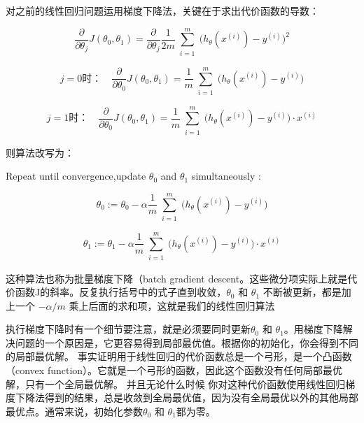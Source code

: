 \documentclass[UTF8]{ctexart}
\begin{document}
对之前的线性回归问题运用梯度下降法，关键在于求出代价函数的导数：

\begin{equation*}
    \frac{\partial}{\partial\theta_j}
    J(\theta_0,\theta_1)=
    \frac{\partial}{\partial\theta_j}
    \frac{1}{2m}
    \sum^m_{\substack{i=1}}
     \Big(h_\theta(x^{(i)})-y^{(i)}\Big)^{2}
\end{equation*}

\begin{equation*}
    j=0 时： \quad \frac{\partial}{\partial\theta_0}
    J(\theta_0,\theta_1)=
    \frac{1}{m}
    \sum^m_{\substack{i=1}}
     \Big(h_\theta(x^{(i)})-y^{(i)}\Big)
\end{equation*}

\begin{equation*}
    j=1 时： \quad \frac{\partial}{\partial\theta_0}
    J(\theta_0,\theta_1)=
    \frac{1}{m}
    \sum^m_{\substack{i=1}}
     \Big(h_\theta(x^{(i)})-y^{(i)}\Big)\cdot x^{(i)}
\end{equation*}

则算法改写为：

Repeat until convergence,update $\theta_0$ and $\theta_1$ simultaneously :

 \begin{equation*}
  \theta_0:= \theta_0 - \alpha
  \frac{1}{m}
    \sum^m_{\substack{i=1}}
     \Big(h_\theta(x^{(i)})-y^{(i)}\Big)
\end{equation*}

\begin{equation*}
  \theta_1:= \theta_1 - \alpha
  \frac{1}{m}
    \sum^m_{\substack{i=1}}
     \Big(h_\theta(x^{(i)})-y^{(i)}\Big)\cdot x^{(i)}
\end{equation*}

这种算法也称为批量梯度下降（batch gradient descent。这些微分项实际上就是代价函数J的斜率。反复执行括号中的式子直到收敛，$\theta_0$ 和 $\theta_1$ 不断被更新，都是加上一个 $-\alpha/m$ 乘上后面的求和项，这就是我们的线性回归算法

执行梯度下降时有一个细节要注意，就是必须要同时更新$\theta_0$ 和 $\theta_1$。用梯度下降解决问题的一个原因是，它更容易得到局部最优值。根据你的初始化，你会得到不同的局部最优解。
事实证明用于线性回归的代价函数总是一个弓形，是一个凸函数（convex function）。它就是一个弓形的函数，因此这个函数没有任何局部最优解，只有一个全局最优解。
并且无论什么时候 你对这种代价函数使用线性回归梯度下降法得到的结果，总是收敛到全局最优值，因为没有全局最优以外的其他局部最优点。通常来说，初始化参数$\theta_0$ 和 $\theta_1$都为零。
\end{document}
